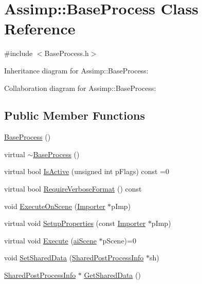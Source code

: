 \hypertarget{class_assimp_1_1_base_process}{\section{Assimp\+:\+:Base\+Process Class Reference}
\label{class_assimp_1_1_base_process}
}


{\ttfamily \#include $<$Base\+Process.\+h$>$}



Inheritance diagram for Assimp\+:\+:Base\+Process\+:


Collaboration diagram for Assimp\+:\+:Base\+Process\+:
\subsection*{Public Member Functions}
\begin{DoxyCompactItemize}
\item 
\hyperlink{class_assimp_1_1_base_process_a715668ddafa105ff30913c64aac24b6f}{Base\+Process} ()
\item 
virtual \hyperlink{class_assimp_1_1_base_process_aec97e1ce73220aee3c941fe6bef0f6c8}{$\sim$\+Base\+Process} ()
\item 
virtual bool \hyperlink{class_assimp_1_1_base_process_ae707ad643e9c45c265f4c03f4c50a219}{Is\+Active} (unsigned int p\+Flags) const =0
\item 
virtual bool \hyperlink{class_assimp_1_1_base_process_afcce32464650fbb7d51c3881a0139046}{Require\+Verbose\+Format} () const 
\item 
void \hyperlink{class_assimp_1_1_base_process_a21f3736d3f3a6df1b8edb5f2ab15c5ae}{Execute\+On\+Scene} (\hyperlink{class_assimp_1_1_importer}{Importer} $\ast$p\+Imp)
\item 
virtual void \hyperlink{class_assimp_1_1_base_process_aae14d0a8c5918642d4a272b7b74b5d70}{Setup\+Properties} (const \hyperlink{class_assimp_1_1_importer}{Importer} $\ast$p\+Imp)
\item 
virtual void \hyperlink{class_assimp_1_1_base_process_ac2ec8dbb815e84a7af573fb3174279e7}{Execute} (\hyperlink{structai_scene}{ai\+Scene} $\ast$p\+Scene)=0
\item 
void \hyperlink{class_assimp_1_1_base_process_aed894a145b058ee3bde213e04fcb2249}{Set\+Shared\+Data} (\hyperlink{class_assimp_1_1_shared_post_process_info}{Shared\+Post\+Process\+Info} $\ast$sh)
\item 
\hyperlink{class_assimp_1_1_shared_post_process_info}{Shared\+Post\+Process\+Info} $\ast$ \hyperlink{class_assimp_1_1_base_process_abff6709540454073db373e8c7e7cd916}{Get\+Shared\+Data} ()
\end{DoxyCompactItemize}
